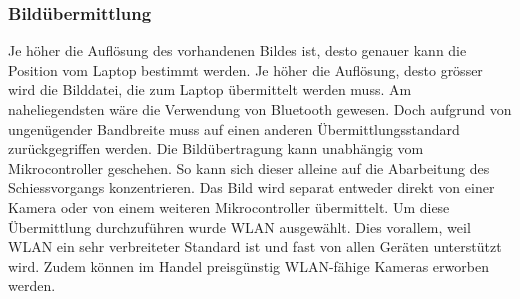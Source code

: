 \subsubsection{Bildübermittlung}
Je höher die Auflösung des vorhandenen Bildes ist, desto genauer kann die Position vom Laptop bestimmt werden. Je höher die Auflösung, desto grösser wird die Bilddatei, die zum Laptop übermittelt werden muss. Am naheliegendsten wäre die Verwendung von Bluetooth gewesen. Doch aufgrund von ungenügender Bandbreite muss auf einen anderen Übermittlungsstandard zurückgegriffen werden. Die Bildübertragung kann unabhängig vom Mikrocontroller geschehen. So kann sich dieser alleine auf die Abarbeitung des Schiessvorgangs konzentrieren. Das Bild wird separat entweder direkt von einer Kamera oder von einem weiteren Mikrocontroller übermittelt. Um diese Übermittlung durchzuführen wurde WLAN ausgewählt. Dies vorallem, weil WLAN ein sehr verbreiteter Standard ist und fast von allen Geräten unterstützt wird. Zudem können im Handel preisgünstig WLAN-fähige Kameras erworben werden.
